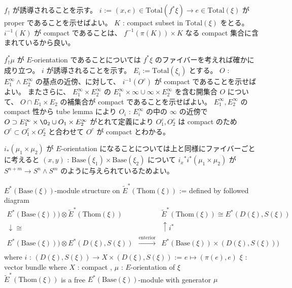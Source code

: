 \documentclass[dvipdfmx]{jsarticle}
\begin{document}
\begin{Proof}
\itemprof
  \(f_\dagger\) が誘導されることを示す。
  \(i\) := \((x,e) \in \text{Total}(f^* \xi) \to e \in \text{Total}(\xi)\) が proper であることを示せばよい。
  \(K\) : compact subset in \(\text{Total}(\xi)\) をとる。
  \(i^{-1}(K)\) が compact であることは、 \(f^{-1}(\pi(K)) \times K\) なる compact 集合に含まれているから良い。

  \(f_{\dagger}^* \mu\) が \(E\)-orientation であることについては \(f^*\xi\) のファイバーを考えれば確かに成り立つ。
\itemprof
  \(i\) が誘導されることを示す。
  \(E_i := \text{Total}(\xi_i)\) とする。
  \(O\) : \(E_1^\infty \wedge E_2^\infty\) の基点の近傍、に対して、 \(i^{-1}(O^c)\) が compact であることを示せばよい。
  またさらに、 \(E_1^\infty \times E_2^\infty\) の \(E_1^\infty \times \infty \cup \infty \times E_2^\infty\) を含む開集合 \(O\) について、 \(O \cap E_1 \times E_2\) の補集合が compact であることを示せばよい。
  \(E_1^\infty , E_2^\infty\) の compact 性から tube lemma により \(O_i\) : \(E_i^\infty\) の中の \(\infty\) の近傍で \(O \supset E_1^\infty \times \O_2\cup O_1 \times E_2^\infty\) がとれて定義により \(O_1^c, O_2^c\) は compact のため \(O^c \subset O_1^c \times O_2^c\) と合わせて \(O^c\) が compact とわかる。

  \(i_*(\mu_1 \times \mu_2)\) が \(E\)-orientation になることについては上と同様にファイバーごとに考えると \((x,y)\) : \(\text{Base}(\xi_1) \times \text{Base}(\xi_2)\) について \({i_x}^* i^*(\mu_1 \times \mu_2)\) が \(S^{n+m} \to S^n \wedge S^m\) のように与えられているためよい。
\end{Proof}

\begin{Theorem}
\itemdefi
  \Define \(E^{*}(\text{Base}(\xi))\)-module structure on \(\tilde{E}^{*}(\text{Thom}(\xi))\) := defined by followed diagram
  \[\begin{matrix}
    E^{*}(\text{Base}(\xi))) \otimes \tilde{E}^{*}(\text{Thom}(\xi)) & & \tilde{E}^{*}(\text{Thom}(\xi)) \cong E^{*}(D(\xi), S(\xi)) \\
    \downarrow \cong & & \uparrow i^* \\
    E^{*}(\text{Base}(\xi))) \otimes E^{*}(D(\xi), S(\xi)) & \overset{\text{enterior product}}{\to} & E^{*}(\text{Base}(\xi)) \times (D(\xi), S(\xi))) \\
  \end{matrix}\]
  where \(i\) : \((D(\xi), S(\xi)) \to X \times (D(\xi), S(\xi))\) := \(e \mapsto (\pi(e), e)\)
\itemprop
  \For \(\xi\) : vector bundle where \(X\) : compact , \(\mu\) : \(E\)-orientation of \(\xi\) \\
  \Then \(\tilde{E}^{*}(\text{Thom}(\xi))\) is a free \(E^{*}(\text{Base}(\xi))\)-module with generator \(\mu\)
\end{Theorem}
\end{document}
